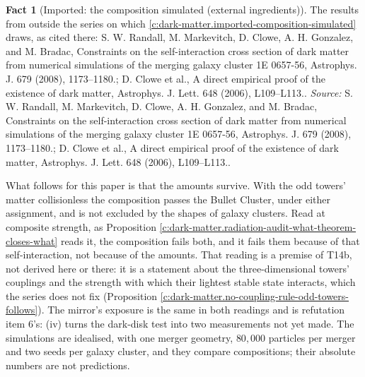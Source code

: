 \documentclass[11pt]{article}
\theoremstyle{definition}
\newtheorem{fact}[theorem]{Fact}
\theoremstyle{plain}
\begin{document}
\begin{fact}[Imported: the composition simulated (external ingredients)]\label{c:dark-matter.imported-composition-simulated-external}
The results from outside the series on which \ref{c:dark-matter.imported-composition-simulated} draws, as cited there: S. W. Randall, M. Markevitch, D. Clowe, A. H. Gonzalez, and M. Bradac, Constraints on the self-interaction cross section of dark matter from numerical simulations of the merging galaxy cluster 1E 0657-56, Astrophys. J. 679 (2008), 1173--1180.; D. Clowe et al., A direct empirical proof of the existence of dark matter, Astrophys. J. Lett. 648 (2006), L109--L113..
\emph{Source:} S. W. Randall, M. Markevitch, D. Clowe, A. H. Gonzalez, and M. Bradac, Constraints on the self-interaction cross section of dark matter from numerical simulations of the merging galaxy cluster 1E 0657-56, Astrophys. J. 679 (2008), 1173--1180.; D. Clowe et al., A direct empirical proof of the existence of dark matter, Astrophys. J. Lett. 648 (2006), L109--L113..
\end{fact}

\label{c:note.dark-matter.setting-composition-galaxy-clusters-galaxy-2}
What follows for this paper is that the amounts survive. With the odd towers' matter collisionless the composition passes the Bullet Cluster, under either assignment, and is not excluded by the shapes of galaxy clusters. Read at composite strength, as Proposition \ref{c:dark-matter.radiation-audit-what-theorem-closes-what} reads it, the composition fails both, and it fails them because of that self-interaction, not because of the amounts. That reading is a premise of T14b, not derived here or there: it is a statement about the three-dimensional towers' couplings and the strength with which their lightest stable state interacts, which the series does not fix (Proposition \ref{c:dark-matter.no-coupling-rule-odd-towers-follows}). The mirror's exposure is the same in both readings and is refutation item 6's: (iv) turns the dark-disk test into two measurements not yet made. The simulations are idealised, with one merger geometry, $80{,}000$ particles per merger and two seeds per galaxy cluster, and they compare compositions; their absolute numbers are not predictions.
\end{document}
